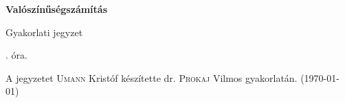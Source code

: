 \documentclass[a4paper,11.5pt]{article}
\begin{document}
	\setlength\parindent{0pt}
	\def\a{\textbf{a}}
	\def\b{\textbf{b}}
	\def\N{\hskip 10 true mm}
	\def\a{\textbf{a}}
	\def\b{\textbf{b}}
	\def\c{\textbf{c}}
	\def\d{\textbf{d}}
	\def\e{\textbf{e}}
	\def\gg{$\gamma$}
	\def\vi{\textbf{i}}
	\def\jj{\textbf{j}}
	\def\kk{\textbf{k}}
	\def\fh{\overrightarrow}
	\def\l{\lambda}
	\def\m{\mu}
	\def\v{\textbf{v}}
	\def\0{\textbf{0}}
	\def\s{\hspace{0.2mm}\vphantom{\beta}}
	\def\Z{\mathbb{Z}}
	\def\Q{\mathbb{Q}}
	\def\R{\mathbb{R}}
	\def\C{\mathbb{C}}
	\def\N{\mathbb{N}}
	\def\Rn{\mathbb{R}^{n}}
	\def\Ra{\overline{\mathbb{R}}}
	\def\sume{\displaystyle\sum_{n=1}^{+\infty}}
	\def\sumn{\displaystyle\sum_{n=0}^{+\infty}}
	\def\biz{\emph{Bizonyítás:\ }}
	\def\narrow{\underset{n\rightarrow+\infty}{\longrightarrow}}
	\def\limn{\displaystyle\lim_{n\to +\infty}}
	
	\theoremstyle{definition}
	\newtheorem{theorem}{Tétel}[subsubsection] %
	
	\theoremstyle{definition}
	\newtheorem{definition}[theorem]{Definíció} %
	\newtheorem{example}[theorem]{Példa} %
	\newtheorem{exercise}[theorem]{Házi feladat} %
	\newtheorem{note}[theorem]{Megjegyzés} %
	\newtheorem{task}[theorem]{Feladat} %
	\newtheorem{revision}[theorem]{Emlékeztető} %
	\begin{center}
		{\LARGE\textbf{Valószínűségszámítás}}
		\smallskip
		
		{\Large Gyakorlati jegyzet}
		
		. óra.
	\end{center}
	A jegyzetet \textsc{Umann} Kristóf készítette dr. \textsc{Prokaj} Vilmos gyakorlatán. (\today)
	
\end{document}
